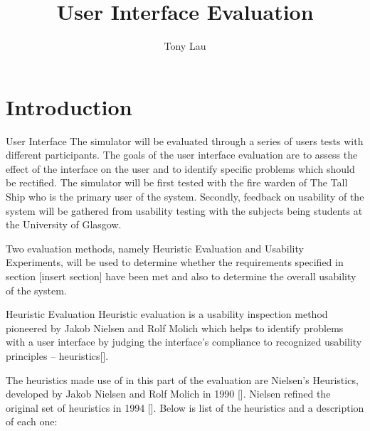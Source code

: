 \documentclass{article}
\begin{document}
\title{User Interface Evaluation}
\author{Tony Lau}
\maketitle
\section{Introduction}
\label{intro}

User Interface
The simulator will be evaluated through a series of users tests with different participants. The goals of the user interface evaluation are to assess the effect of the interface on the user and to identify specific problems which should be rectified. The simulator will be first tested with the fire warden of The Tall Ship who is the primary user of the system. Secondly, feedback on usability of the system will be gathered from usability testing with the subjects being students at the University of Glasgow.

Two evaluation methods, namely Heuristic Evaluation and Usability Experiments, will be used to determine whether the requirements specified in section [insert section] have been met and also to determine the overall usability of the system.

Heuristic Evaluation
Heuristic evaluation is a usability inspection method pioneered by Jakob Nielsen and Rolf Molich which helps to identify problems with a user interface by judging the interface’s compliance to recognized usability principles -- heuristics[].

The heuristics made use of in this part of the evaluation are Nielsen’s Heuristics, developed by Jakob Nielsen and Rolf Molich in 1990 []. Nielsen refined the original set of heuristics in 1994 []. Below is list of the heuristics and a description of each one:
\end{document}
